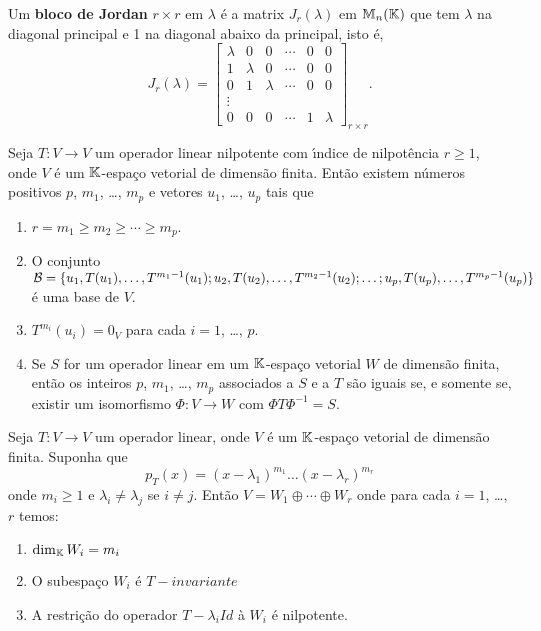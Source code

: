 \begin{definicao}
	Um \textbf{bloco de Jordan} $r \times r$ em $\lambda$ \'e a matrix $J_r(\lambda)$ em $\mathbb{M}_n(\mathbb{K})$ que tem $\lambda$ na diagonal principal e 1 na diagonal abaixo da principal, isto \'e,
	\[
	J_r(\lambda) = \begin{bmatrix}
		\lambda & 0 & 0 & \cdots & 0 & 0\\
		1 & \lambda & 0 & \cdots & 0 & 0\\
		0 & 1 & \lambda & \cdots & 0 & 0\\
		\vdots\\
		0 & 0 & 0 & \cdots & 1 & \lambda
	\end{bmatrix}_{r \times r}.
\]
\end{definicao}

\begin{teorema}\label{operador_nilpotente}
	Seja $T : V \to V$ um operador linear nilpotente com {\'\i}ndice de nilpot\^encia $r \ge 1$, onde $V$ \'e um $\mathbb{K}$-espa\c{c}o vetorial de dimens\~ao finita. Ent\~ao existem n\'umeros positivos $p$, $m_1$, \dots, $m_p$ e vetores $u_1$, \dots, $u_p$ tais que
	\begin{enumerate}[label=({\roman*})]
		\item\label{propriedade_i_operado_nilpotente} $r = m_1 \ge m_2 \ge \cdots \ge m_p$.
		\item\label{propriedade_ii_operado_nilpotente} O conjunto $\mathcal{B} = \{u_1, T(u_1), \dots, T^{m_1 - 1}(u_1); u_2, T(u_2), \dots, T^{m_2 - 1}(u_2); \dots; u_p, T(u_p), \dots, \linebreak T^{m_p - 1}(u_p)\}$ \'e uma base de $V$.
		\item\label{propriedade_iii_operado_nilpotente} $T^{m_i}(u_i) = 0_V$ para cada $i = 1$, \dots, $p$.
		\item\label{propriedade_iv_operado_nilpotente} Se $S$ for um operador linear em um $\mathbb{K}$-espa\c{c}o vetorial $W$ de dimens\~ao finita, ent\~ao os inteiros $p$, $m_1$, \dots, $m_p$ associados a $S$ e a $T$ s\~ao iguais se, e somente se, existir um isomorfismo $\Phi : V \to W$ com $\Phi T \Phi^{-1} = S$.
	\end{enumerate}
\end{teorema}

\begin{teorema}\label{forma_de_jordan}
	Seja $T : V \to V$ um operador linear, onde $V$ \'e um $\mathbb{K}$-espa\c{c}o vetorial de dimens\~ao finita. Suponha que
	\[
		p_T(x) = (x - \lambda_1)^{m_1}\dots(x - \lambda_r)^{m_r}
	\]
	onde $m_i \ge 1$ e $\lambda_i \ne \lambda_j$ se $i \ne j$. Ent\~ao $V = W_1 \oplus \cdots \oplus W_r$ onde para cada $i = 1$, \dots, $r$ temos:
	\begin{enumerate}[label=({\roman*})]
		\item\label{propriedade_i_forma_de_jordan} $\dim_{\mathbb{K}} W_i = m_i$
		\item\label{propriedade_ii_forma_de_jordan} O subespa\c{c}o $W_i$ \'e $T-invariante$
		\item\label{propriedade_iii_forma_de_jordan} A restri\c{c}\~ao do operador $T - \lambda_i Id$ \`a $W_i$ \'e nilpotente.
	\end{enumerate}
\end{teorema}

